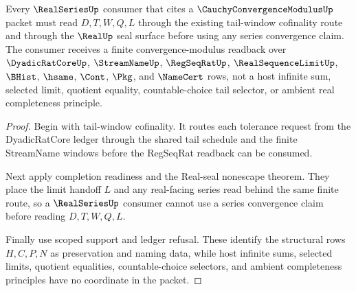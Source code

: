 \begin{theorem}
\label{thm:cauchy-convergence-modulus-realseries-readback}
Every $\RealSeriesUp$ consumer that cites a $\CauchyConvergenceModulusUp$ packet must read $D,T,W,Q,L$ through the existing tail-window cofinality route and through the $\RealUp$ seal surface before using any series convergence claim. The consumer receives a finite convergence-modulus readback over $\DyadicRatCoreUp$, $\StreamNameUp$, $\RegSeqRatUp$, $\RealSequenceLimitUp$, $\BHist$, $\hsame$, $\Cont$, $\Pkg$, and $\NameCert$ rows, not a host infinite sum, selected limit, quotient equality, countable-choice tail selector, or ambient real completeness principle.
\end{theorem}
\begin{proof}
Begin with tail-window cofinality. It routes each tolerance request from the DyadicRatCore ledger through the shared tail schedule and the finite StreamName windows before the RegSeqRat readback can be consumed.

Next apply completion readiness and the Real-seal nonescape theorem. They place the limit handoff $L$ and any real-facing series read behind the same finite route, so a $\RealSeriesUp$ consumer cannot use a series convergence claim before reading $D,T,W,Q,L$.

Finally use scoped support and ledger refusal. These identify the structural rows $H,C,P,N$ as preservation and naming data, while host infinite sums, selected limits, quotient equalities, countable-choice selectors, and ambient completeness principles have no coordinate in the packet.
\end{proof}

